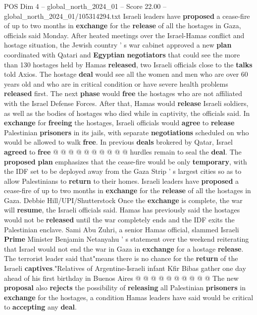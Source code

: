 \begin{textsample}{POS Dim 4 – global\_north\_2024\_01 – Score 22.00 – global\_north\_2024\_01/105314294.txt}  \label{ex:f4_pos_331}
Israeli leaders have \textbf{proposed} a cease-fire of up to two months in \textbf{exchange} for the \textbf{release} of all the hostages in Gaza, officials said Monday.
After heated meetings over the Israel-Hamas conflict and hostage situation, the Jewish country ' s war cabinet approved a new \textbf{plan} coordinated with Qatari and \textbf{Egyptian} \textbf{negotiators} that could see the more than 130 hostages held by Hamas \textbf{released}, two Israeli officials close to the \textbf{talks} told Axios.
The hostage \textbf{deal} would see all the women and men who are over 60 years old and who are in critical condition or have severe health problems \textbf{released} first.
The next \textbf{phase} would \textbf{free} the hostages who are not affiliated with the Israel Defense Forces.
After that, Hamas would \textbf{release} Israeli soldiers, as well as the bodies of hostages who died while in captivity, the officials said.
In \textbf{exchange} for \textbf{freeing} the hostages, Israeli officials would \textbf{agree} to \textbf{release} Palestinian \textbf{prisoners} in its jails, with separate \textbf{negotiations} scheduled on who would be allowed to walk \textbf{free}.
In previous \textbf{deals} brokered by Qatar, Israel \textbf{agreed} to \textbf{free} @ @ @ @ @ @ @ @ @ @ hurdles remain to seal the \textbf{deal}.
The \textbf{proposed} \textbf{plan} emphasizes that the cease-fire would be only \textbf{temporary}, with the IDF set to be deployed away from the Gaza Strip ' s largest cities so as to allow Palestinians to \textbf{return} to their homes.
Israeli leaders have \textbf{proposed} a cease-fire of up to two months in \textbf{exchange} for the \textbf{release} of all the hostages in Gaza.
Debbie Hill/UPI/Shutterstock Once the \textbf{exchange} is complete, the war will \textbf{resume}, the Israeli officials said.
Hamas has previously said the hostages would not be \textbf{released} until the war completely ends and the IDF exits the Palestinian enclave.
Sami Abu Zuhri, a senior Hamas official, slammed Israeli \textbf{Prime} Minister Benjamin Netanyahu ' s statement over the weekend reiterating that Israel would not end the war in Gaza in \textbf{exchange} for a hostage \textbf{release}.
The terrorist leader said that"means there is no chance for the \textbf{return} of the Israeli \textbf{captives}."Relatives of Argentine-Israeli infant Kfir Bibas gather one day ahead of his first birthday in Buenos Aires @ @ @ @ @ @ @ @ @ @ The new \textbf{proposal} also \textbf{rejects} the possibility of \textbf{releasing} all Palestinian \textbf{prisoners} in \textbf{exchange} for the hostages, a condition Hamas leaders have said would be critical to \textbf{accepting} any \textbf{deal}.

\end{textsample}
